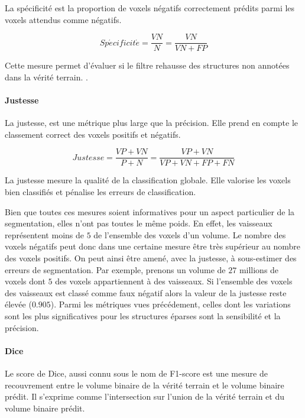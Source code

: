 La spécificité est la proportion de voxels négatifs correctement prédits parmi les voxels attendus comme négatifs.

\begin{equation}
  Sp\acute{e}cificit\acute{e} = \frac{VN}{N} = \frac{VN}{VN+FP}
\end{equation}

Cette mesure permet d'évaluer si le filtre rehausse des structures non annotées dans la vérité terrain. .

\paragraph{Justesse}

La justesse, est une métrique plus large que la précision. Elle prend en compte le classement correct des voxels positifs et négatifs. 

\begin{equation}
  Justesse = \frac{VP+VN}{P+N} = \frac{VP+VN}{VP+VN+FP+FN}
\end{equation}

La justesse mesure la qualité de la classification globale. Elle valorise les voxels bien classifiés et pénalise les erreurs de classification.

Bien que toutes ces mesures soient informatives pour un aspect particulier de la segmentation, elles n'ont pas toutes le même poids. En effet, les vaisseaux représentent moins de $5$ \percent{}de l'ensemble des voxels d'un volume. Le nombre des voxels négatifs peut donc dans une certaine mesure être très supérieur au nombre des voxels positifs. On peut ainsi être amené, avec la justesse, à sous-estimer des erreurs de segmentation. Par exemple, prenons un  volume de $27$ millions de voxels dont $5$ \percent{} des voxels appartiennent à des vaisseaux. Si l'ensemble des voxels des vaisseaux est classé comme faux négatif alors la valeur de la justesse reste élevée ($0.905$). Parmi les métriques vues précédement, celles dont les variations sont les plus significatives pour les structures éparses sont la sensibilité et la précision. 

\paragraph{Dice}

Le score de Dice, aussi connu sous le nom de F1-score est une mesure de recouvrement entre le volume binaire de la vérité terrain et le volume binaire prédit. Il s'exprime comme l'intersection sur l'union de la vérité terrain et du volume binaire prédit.

